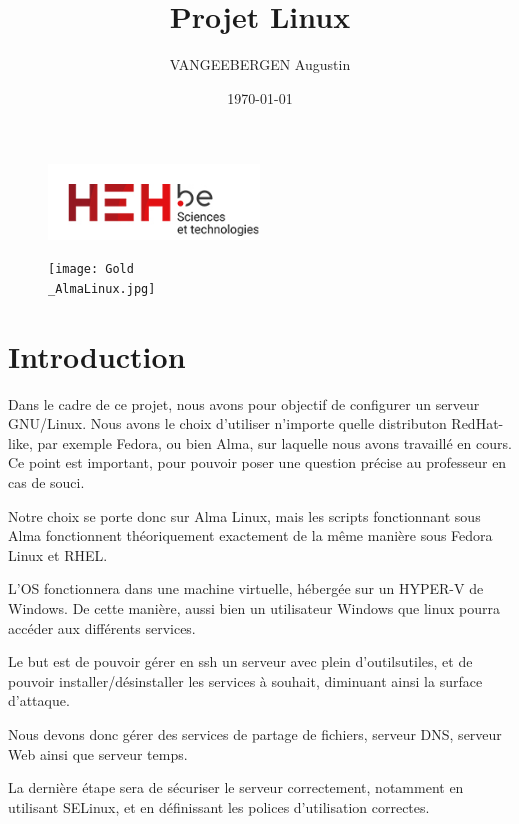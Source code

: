 \documentclass{article}
\title{Projet Linux}
\author{VANGEEBERGEN Augustin}
\date{\today}
\begin{document}
	
	\maketitle
	
	\begin{figure}[h]
		\centering
		\includegraphics[width=0.5\textwidth]{logo.png}
		\label{fig:logoheh}
	\end{figure}
	
	\begin{figure}[h!]
		\centering
		\texttt{[image: Gold\\\_AlmaLinux.jpg]}	
		\label{fig:logoheh}
	\end{figure}
	
	\newpage


	\tableofcontents
	\newpage
	

	
	\section{Introduction}
	Dans le cadre de ce projet, nous avons pour objectif de configurer un serveur GNU/Linux. Nous avons le choix d'utiliser n'importe quelle distributon RedHat-like, par exemple Fedora, ou bien Alma, sur laquelle nous avons travaillé en cours. Ce point est important, pour pouvoir poser une question précise au professeur en cas de souci.
	
	Notre choix se porte donc sur Alma Linux, mais les scripts fonctionnant sous Alma fonctionnent théoriquement exactement de la même manière sous Fedora Linux et RHEL.
	
	L'OS fonctionnera dans une machine virtuelle, hébergée sur un HYPER-V de Windows. De cette manière, aussi bien un utilisateur Windows que linux pourra accéder aux différents services.
	
	Le but est de pouvoir gérer en ssh un serveur avec plein d'outilsutiles, et de pouvoir installer/désinstaller les services à souhait, diminuant ainsi la surface d'attaque.
	
	Nous devons donc gérer des services de partage de fichiers, serveur DNS, serveur Web ainsi que serveur temps.
	
	La dernière étape sera de sécuriser le serveur correctement, notamment en utilisant SELinux, et en définissant les polices d'utilisation correctes.
	
\end{document}
